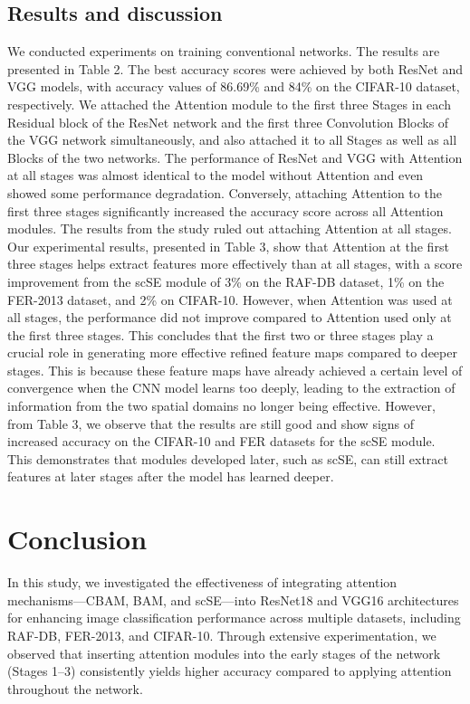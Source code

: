 \documentclass[pdflatex,sn-mathphys-num]{sn-jnl}%
\theoremstyle{thmstyleone}%
\theoremstyle{thmstyletwo}%
\theoremstyle{thmstylethree}%
\begin{document}
\subsection{Results and discussion}
We conducted experiments on training conventional networks. The results are presented in Table 2. The best accuracy scores were achieved by both ResNet and VGG models, with accuracy values of 86.69\% and 84\% on the CIFAR-10 dataset, respectively. We attached the Attention module to the first three Stages in each Residual block of the ResNet network and the first three Convolution Blocks of the VGG network simultaneously, and also attached it to all Stages as well as all Blocks of the two networks. The performance of ResNet and VGG with Attention at all stages was almost identical to the model without Attention and even showed some performance degradation. Conversely, attaching Attention to the first three stages significantly increased the accuracy score across all Attention modules. The results from the study ruled out attaching Attention at all stages. Our experimental results, presented in Table 3, show that Attention at the first three stages helps extract features more effectively than at all stages, with a score improvement from the scSE module of 3\% on the RAF-DB dataset, 1\% on the FER-2013 dataset, and 2\% on CIFAR-10. However, when Attention was used at all stages, the performance did not improve compared to Attention used only at the first three stages. This concludes that the first two or three stages play a crucial role in generating more effective refined feature maps compared to deeper stages. This is because these feature maps have already achieved a certain level of convergence when the CNN model learns too deeply, leading to the extraction of information from the two spatial domains no longer being effective. However, from Table 3, we observe that the results are still good and show signs of increased accuracy on the CIFAR-10 and FER datasets for the scSE module. This demonstrates that modules developed later, such as scSE, can still extract features at later stages after the model has learned deeper.


\section{Conclusion}\label{secA1}

In this study, we investigated the effectiveness of integrating attention mechanisms—CBAM, BAM, and scSE—into ResNet18 and VGG16 architectures for enhancing image classification performance across multiple datasets, including RAF-DB, FER-2013, and CIFAR-10. Through extensive experimentation, we observed that inserting attention modules into the early stages of the network (Stages 1–3) consistently yields higher accuracy compared to applying attention throughout the network.
\end{document}
